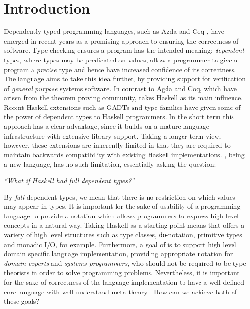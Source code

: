 \section{Introduction}

Dependently typed programming languages, such as Agda \cite{norell2007thesis}
and Coq \cite{Bertot2004}, have emerged in recent years as a promising approach
to ensuring the correctness of software. Type checking ensures a program has
the intended meaning; \emph{dependent} types, where types may be predicated
on values, allow a programmer to give a program a \emph{precise} type and 
hence have increased confidence of its correctness.
The \Idris{} language
\cite{Brady2011a} aims to take this idea further, by providing support for
verification of \emph{general purpose} systems software. In contrast to Agda and Coq,
which have arisen from the theorem proving community, \Idris{} takes Haskell as
its main influence.  Recent Haskell extensions such as GADTs and type families have
given some of the power of dependent types to Haskell programmers. In the short
term this approach has a clear advantage, since it builds on a mature language
infrastructure with extensive library support.
Taking a longer term view, however,
these extensions are inherently limited in that they are required to maintain
backwards compatibility with existing Haskell implementations.  \Idris{}, being a new
language, has no such limitation, essentially asking the question:

\begin{center}
\emph{``What if Haskell had \emph{full} dependent types?''}
\end{center}

By \emph{full} dependent types, we mean that there is no restriction on which
values may appear in types.  It is important for the sake of usability of a
programming language to provide a notation which allows programmers to express
high level concepts in a natural way. Taking Haskell as a starting point means
that \Idris{} offers a variety of high level structures such as type classes,
\texttt{do}-notation, primitive types and monadic I/O, for example.
Furthermore, a goal of \Idris{} is to support high level domain specific
language implementation, providing appropriate notation for \emph{domain
experts} and \emph{systems programmers}, who should not be required to be type
theorists in order to solve programming problems.  Nevertheless, it is
important for the sake of correctness of the language implementation to have a
well-defined core language with well-understood meta-theory \cite{Altenkirch2010}. 
How can we achieve both of these goals?

